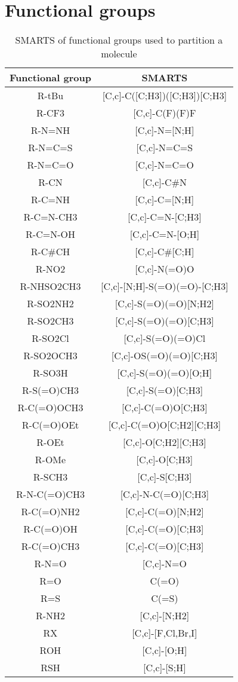 \chapter{Functional groups}
\label{app:functional_groups_list}


\begin{table}[ht]
   \centering
   \caption{SMARTS of functional groups used to partition a molecule}
   \begin{tabular}{cc}
        \toprule
        \textbf{Functional group} & \textbf{SMARTS} \\
       \midrule
    R-tBu & [C,c]-C([C;H3])([C;H3])[C;H3]\\
    R-CF3 & [C,c]-C(F)(F)F\\
    R-N=NH & [C,c]-N=[N;H]\\
    R-N=C=S & [C,c]-N=C=S\\
    R-N=C=O & [C,c]-N=C=O\\
    R-CN & [C,c]-C\#N\\
    R-C=NH & [C,c]-C=[N;H]\\
    R-C=N-CH3 & [C,c]-C=N-[C;H3]\\
    R-C=N-OH & [C,c]-C=N-[O;H]\\
    R-C\#CH & [C,c]-C\#[C;H]\\
    R-NO2 & [C,c]-N(=O)O\\
    R-NHSO2CH3 & [C,c]-[N;H]-S(=O)(=O)-[C;H3]\\
    R-SO2NH2 & [C,c]-S(=O)(=O)[N;H2]\\
    R-SO2CH3 & [C,c]-S(=O)(=O)[C;H3]\\
    R-SO2Cl & [C,c]-S(=O)(=O)Cl\\
    R-SO2OCH3 & [C,c]-OS(=O)(=O)[C;H3]\\
    R-SO3H & [C,c]-S(=O)(=O)[O;H]\\
    R-S(=O)CH3 & [C,c]-S(=O)[C;H3]\\
    R-C(=O)OCH3 & [C,c]-C(=O)O[C;H3]\\
    R-C(=O)OEt & [C,c]-C(=O)O[C;H2][C;H3]\\
    R-OEt & [C,c]-O[C;H2][C;H3]\\
    R-OMe & [C,c]-O[C;H3]\\
    R-SCH3 & [C,c]-S[C;H3]\\
    R-N-C(=O)CH3 & [C,c]-N-C(=O)[C;H3]\\
    R-C(=O)NH2 & [C,c]-C(=O)[N;H2]\\
    R-C(=O)OH & [C,c]-C(=O)[C;H3]\\
    R-C(=O)CH3 & [C,c]-C(=O)[C;H3]\\
    R-N=O & [C,c]-N=O\\
    R=O & C(=O)\\
    R=S & C(=S)\\
    R-NH2 & [C,c]-[N;H2]\\
    RX & [C,c]-[F,Cl,Br,I]\\
    ROH & [C,c]-[O;H]\\
    RSH & [C,c]-[S;H]\\
\bottomrule
\end{tabular}
\end{table}



